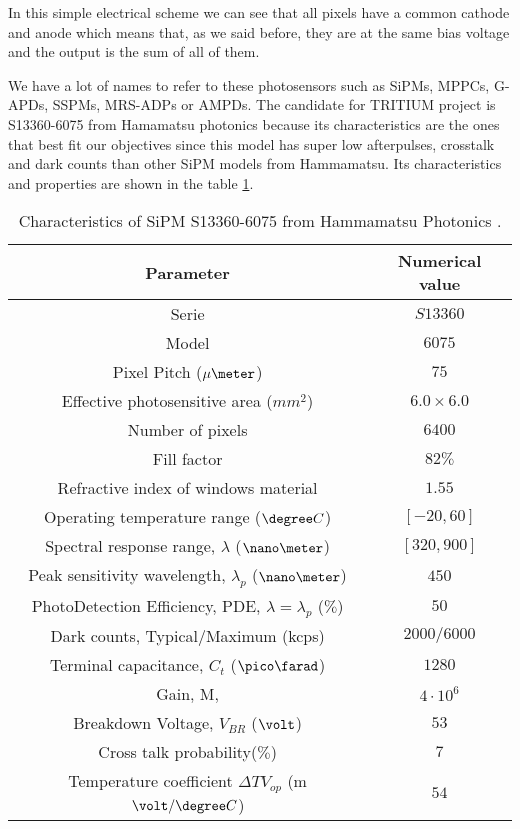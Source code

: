In this simple electrical scheme we can see that all pixels have a common cathode and anode which means that, as we said before, they are at the same bias voltage and the output is the sum of all of them.

We have a lot of names to refer to these photosensors such as SiPMs, MPPCs, G-APDs, SSPMs, MRS-ADPs or AMPDs. The candidate for TRITIUM project is S13360-6075 from Hamamatsu photonics \cite{DataSheetHammamatsu_1_SiPM_75} because its characteristics are the ones that best fit our objectives since this model has super low afterpulses, crosstalk and dark counts than other SiPM models from Hammamatsu. Its characteristics and properties are shown in the table \ref{tab:PropertiesOfSiPM75}. 

\begin{table}[htbp]
\begin{center}
\begin{tabular}{|c|c|}
\hline
Parameter & Numerical value \\
\hline \hline \hline
Serie & $S13360$ \\ \hline
Model & $6075$ \\ \hline
Pixel Pitch ($\mu\meter$) & $75$ \\ \hline
Effective photosensitive area ($mm^2$) & $6.0 \times 6.0$ \\ \hline
Number of pixels & $6400$ \\ \hline
Fill factor & $82\%$ \\ \hline
Refractive index of windows material & $1.55$ \\ \hline
Operating temperature range ($\degree C$)& $[-20,60]$ \\ \hline
Spectral response range, $\lambda$ ($\nano\meter$) & $[320, 900]$ \\ \hline
Peak sensitivity wavelength, $\lambda_p$ ($\nano\meter$) & $450$ \\ \hline
PhotoDetection Efficiency, PDE, $\lambda=\lambda_p$ ($\%$) & $50$ \\ \hline
Dark counts, Typical/Maximum (kcps) & $2000/6000$ \\ \hline
Terminal capacitance, $C_t$ ($\pico\farad$) & $1280$ \\ \hline
Gain, M, & $4 \cdot{} 10^6$ \\ \hline
Breakdown Voltage, $V_{BR}$ ($\volt$) & $53$ \\ \hline
Cross talk probability($\%$) & $7$ \\ \hline
Temperature coefficient $\Delta TV_{op}$ (m$\volt/\degree C$) & $54$ \\ \hline
\end{tabular}
\caption{Characteristics of SiPM S13360-6075 from Hammamatsu Photonics \cite{DataSheetHammamatsu_1_SiPM_75}.}
\label{tab:PropertiesOfSiPM75}
\end{center}
\end{table}

